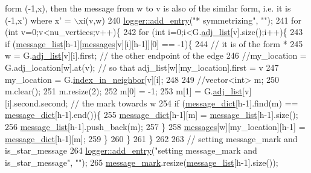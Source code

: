\begin{DoxyCode}
{       form (-1,x), then the message from w to v is also of the similar form, i.e. it is (-1,x') where x' = \(\backslash\)xi(v,w)}
240   \hyperlink{classlogger_a710163deb17bc81f70d53d285b8ac9ac}{logger::add\_entry}(\textcolor{stringliteral}{"* symmetrizing"}, \textcolor{stringliteral}{""});
241   \textcolor{keywordflow}{for} (\textcolor{keywordtype}{int} v=0;v<nu\_vertices;v++)\{
242     \textcolor{keywordflow}{for} (\textcolor{keywordtype}{int} i=0;i<G.\hyperlink{classmarked__graph_a1a0bf7ca413a278763f7c878b3b6fd6f}{adj\_list}[v].size();i++)\{
243       \textcolor{keywordflow}{if} (\hyperlink{classgraph__message_aa17fdb629b423343edfafa97252763ef}{message\_list}[h-1][\hyperlink{classgraph__message_aac77e098f0acf9650116a8e51fe3b4b7}{messages}[v][i][h-1]][0] == -1)\{
244         \textcolor{comment}{// it is of the form *}
245         w = G.\hyperlink{classmarked__graph_a1a0bf7ca413a278763f7c878b3b6fd6f}{adj\_list}[v][i].first; \textcolor{comment}{// the other endpoint of the edge}
246         \textcolor{comment}{//my\_location = G.adj\_location[w].at(v); // so that adj\_list[w][my\_location].first = v}
247         my\_location = G.\hyperlink{classmarked__graph_aee10b537408de42476609c1e45c075d0}{index\_in\_neighbor}[v][i];
248 
249         \textcolor{comment}{//vector<int> m;}
250         m.clear();
251         m.resize(2);
252         m[0] = -1;
253         m[1] = G.\hyperlink{classmarked__graph_a1a0bf7ca413a278763f7c878b3b6fd6f}{adj\_list}[v][i].second.second; \textcolor{comment}{// the mark towards w}
254         \textcolor{keywordflow}{if} (\hyperlink{classgraph__message_ab54d89b122c2b1322da0d5db2043fb84}{message\_dict}[h-1].find(m) == \hyperlink{classgraph__message_ab54d89b122c2b1322da0d5db2043fb84}{message\_dict}[h-1].end())\{
255           \hyperlink{classgraph__message_ab54d89b122c2b1322da0d5db2043fb84}{message\_dict}[h-1][m] = \hyperlink{classgraph__message_aa17fdb629b423343edfafa97252763ef}{message\_list}[h-1].size();
256           \hyperlink{classgraph__message_aa17fdb629b423343edfafa97252763ef}{message\_list}[h-1].push\_back(m);
257         \}
258         \hyperlink{classgraph__message_aac77e098f0acf9650116a8e51fe3b4b7}{messages}[w][my\_location][h-1] = \hyperlink{classgraph__message_ab54d89b122c2b1322da0d5db2043fb84}{message\_dict}[h-1][m];
259       \}
260     \}
261   \}
262 
263   \textcolor{comment}{// setting message\_mark and is\_star\_message}
264   \hyperlink{classlogger_a710163deb17bc81f70d53d285b8ac9ac}{logger::add\_entry}(\textcolor{stringliteral}{"setting message\_mark and is\_star\_message"}, \textcolor{stringliteral}{""});
265   \hyperlink{classgraph__message_a49d9af5150daf0599c29fe18cb032fa5}{message\_mark}.resize(\hyperlink{classgraph__message_aa17fdb629b423343edfafa97252763ef}{message\_list}[h-1].size());

\end{DoxyCode}
